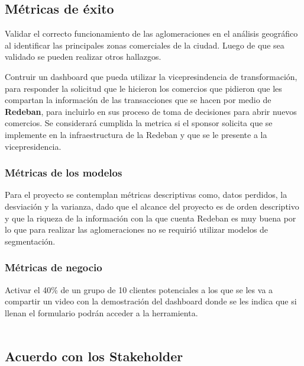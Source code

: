 \documentclass[a4paper]{article}
\begin{document}
\subsection{Métricas de éxito}

Validar el correcto funcionamiento de las aglomeraciones en el análisis geográfico al identificar las principales zonas comerciales de la ciudad. Luego de que sea validado se pueden realizar otros hallazgos.

Contruir un dashboard que pueda utilizar la vicepresindencia de transformación, para responder la solicitud que le hicieron los comercios que pidieron que les compartan la información de las transacciones que se hacen por medio de \textbf{Redeban}, para incluirlo en sus proceso de toma de decisiones para abrir nuevos comercios. Se considerará cumplida la metrica si el sponsor solicita que se implemente en la infraestructura de la Redeban y que se le presente a la vicepresidencia.

\subsubsection{Métricas de los modelos}

Para el proyecto se contemplan métricas descriptivas como, datos perdidos, la desviación y la varianza, dado que el alcance del proyecto es de orden descriptivo y que la riqueza de la información con la que cuenta Redeban es muy buena por lo que para realizar las aglomeraciones no se requirió utilizar modelos de segmentación.

\subsubsection{Métricas de negocio}

Activar el 40\% de un grupo de 10 clientes potenciales a los que se les va a compartir un video con la demostración del dashboard donde se les indica que si llenan el formulario podrán acceder a la herramienta.\\

\\

\subsection{Acuerdo con los Stakeholder}
\end{document}
